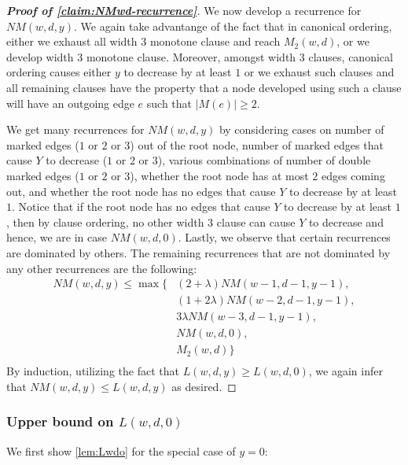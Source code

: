 \documentclass[10pt,a4paper]{article}
\newcommand{\openfunction}{Y}
\newcommand{\openinteger}{y}
\begin{document}
\begin{proof}[\textbf{Proof of \cref{claim:NMwd-recurrence}}]
We now develop a recurrence for $NM(w, d, \openinteger)$.
We again take advantange of the fact that in canonical ordering, either we exhaust all width $3$ monotone clause and reach $M_2(w, d)$, or we develop width $3$ monotone clause. Moreover, amongst width $3$ clauses, canonical ordering causes either $\openinteger$ to decrease by at least $1$ or we exhaust such clauses and all remaining clauses have the property that a node developed using such a clause will have an outgoing edge $e$ such that $|M(e)| \ge 2$. 

We get many recurrences for $NM(w, d, \openinteger)$ by considering cases on number of marked edges ($1$ or $2$ or $3$) out of the root node, number of marked edges that cause $\openfunction$ to decrease ($1$ or $2$ or $3$), various combinations of number of double marked edges ($1$ or $2$ or $3$), whether the root node has at most $2$ edges coming out, and whether the root node has no edges that cause $\openfunction$ to decrease by at least $1$. Notice that if the root node has no edges that cause $\openfunction$ to decrease by at least $1$, then by clause ordering, no other width $3$ clause can cause $\openfunction$ to decrease and hence, we are in case $NM(w, d, 0)$. Lastly, we observe that certain recurrences are dominated by others. The remaining recurrences that are not dominated by any other recurrences are the following:
\begin{align*}
NM(w, d, \openinteger) \le 
\max\{
& (2+\lambda) NM(w-1, d-1, \openinteger-1),\\
& (1+2\lambda) NM(w-2, d-1, \openinteger-1),\\
& 3\lambda NM(w-3, d-1, \openinteger-1),\\
& NM(w, d, 0),\\
& M_2(w, d)
\}\\
\end{align*}
By induction, utilizing the fact that $L(w, d, \openinteger) \ge L(w, d, 0)$, we again infer that $NM(w, d, \openinteger) \le L(w, d, \openinteger)$ as desired.
\end{proof}





\subsubsection{Upper bound on $L(w, d, 0)$}

We first show \cref{lem:Lwdo} for the special case of $\openinteger = 0$:
\end{document}
